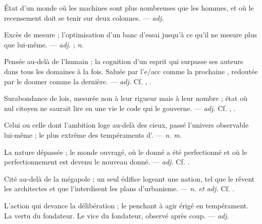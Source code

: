  État d'un monde où les machines sont plus nombreuses que les hommes, et où le recensement doit se tenir sur deux colonnes.   ---  \textit{adj.}

 Excès de mesure ; l'optimisation d'un banc d'essai jusqu'à ce qu'il ne mesure plus que lui-même.  ---  \textit{adj.} ;  \textit{n.}

 Pensée au-delà de l'humain ; la cognition d'un esprit qui surpasse ses auteurs dans tous les domaines à la fois. Saluée par l'e/acc comme la prochaine , redoutée par le doomer comme la dernière. ---  \textit{adj.} Cf. , .

 Surabondance de lois, mesurée non à leur rigueur mais à leur nombre ; état où nul citoyen ne saurait lire en une vie le code qui le gouverne. ---  \textit{adj.} Cf. , .

 Celui ou celle dont l'ambition loge au-delà des cieux, passé l'univers observable lui-même ; le plus extrême des tempéraments d'.  ---  \textit{n. m.}

 La nature dépassée ; le monde ouvragé, où le donné a été perfectionné et où le perfectionnement est devenu le nouveau donné. ---  \textit{adj.} Cf. .

 Cité au-delà de la mégapole ; un seul édifice logeant une nation, tel que le rêvent les architectes et que l'interdisent les plans d'urbanisme. ---  \textit{n. et adj.} Cf. .

 L'action qui devance la délibération ; le penchant à agir érigé en tempérament.   La vertu du fondateur.   Le vice du fondateur, observé après coup. ---  \textit{adj.}

